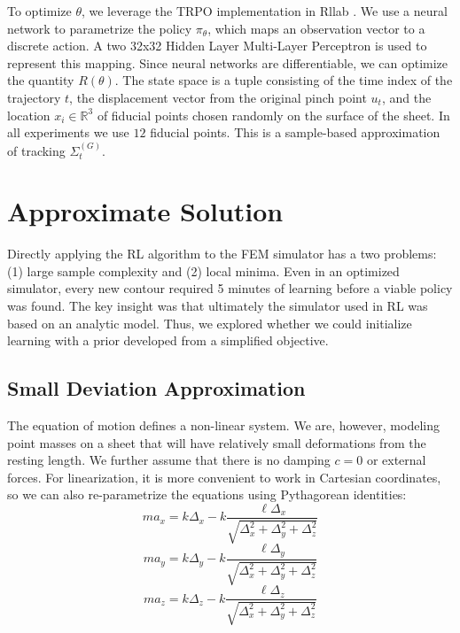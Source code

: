 To optimize $\theta$, we leverage the TRPO implementation \cite{schulman2015trust} in Rllab \cite{duan2016benchmarking}. 
We use a neural network to parametrize the policy $\pi_\theta$, which maps an observation vector to a discrete action.
A two 32x32 Hidden Layer Multi-Layer Perceptron is used to represent this mapping. Since neural networks are differentiable, we can optimize the quantity $R(\theta)$.
The state space is a tuple consisting of the time index of the trajectory $t$, the displacement vector from the original pinch point $u_t$, and the location $x_i \in \mathbb{R}^3$ of fiducial points chosen randomly on the surface of the sheet. In all experiments we use $12$ fiducial points. 
This is a sample-based approximation of tracking $\Sigma^{(G)}_t$.


\section{Approximate Solution}
Directly applying the RL algorithm to the FEM simulator has a two problems: (1) large sample complexity and (2) local minima.
Even in an optimized simulator, every new contour required 5 minutes of learning before a viable policy was found.
The key insight was that ultimately the simulator used in RL was based on an analytic model.
Thus, we explored whether we could initialize learning with a prior developed from a simplified objective.

\subsection*{Small Deviation Approximation}
The equation of motion defines a non-linear system. We are, however, modeling point masses on a sheet that will have relatively small deformations from the resting length. 
We further assume that there is no damping $c=0$ or external forces.
For linearization, it is more convenient to work in Cartesian coordinates, so we can also re-parametrize the equations using Pythagorean identities:
\[
m a_x = k  \Delta_x - k \frac{\ell \Delta_x }{\sqrt{\Delta_x^2 + \Delta_y^2 + \Delta_z^2}} 
\]
\[
m a_y = k  \Delta_y - k \frac{\ell \Delta_y }{\sqrt{\Delta_x^2 + \Delta_y^2 + \Delta_z^2}}  
\]
\[
m a_z = k  \Delta_z - k\frac{\ell \Delta_z }{\sqrt{\Delta_x^2 + \Delta_y^2 + \Delta_z^2}} 
\]

